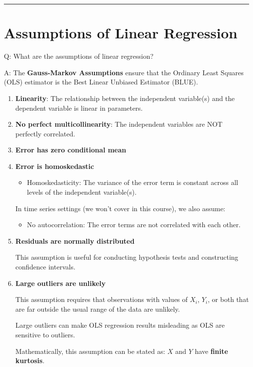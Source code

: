 \documentclass[
  12pt,
]{scrbook}
\providecommand{\tightlist}{%
  \setlength{\itemsep}{0pt}\setlength{\parskip}{0pt}}
\renewcommand{\tightlist}{\setlength{\itemsep}{0.5\baselineskip}\setlength{\parskip}{0.2\baselineskip}}
\theoremstyle{plain}
\theoremstyle{definition}
\theoremstyle{remark}
\begin{document}
\begin{center}\rule{0.5\linewidth}{0.5pt}\end{center}

\section{Assumptions of Linear
Regression}\label{assumptions-of-linear-regression}

Q: What are the assumptions of linear regression?

A: The \textbf{Gauss-Markov Assumptions} ensure that the Ordinary Least
Squares (OLS) estimator is the Best Linear Unbiased Estimator (BLUE).

\begin{enumerate}
\def\labelenumi{\arabic{enumi}.}
\item
  \textbf{Linearity}: The relationship between the independent
  variable(s) and the dependent variable is linear in parameters.
\item
  \textbf{No perfect multicollinearity}: The independent variables are
  NOT {perfectly correlated.}
\item
  \textbf{Error has zero conditional mean}
\item
  \textbf{Error is homoskedastic}

  \begin{itemize}
  \tightlist
  \item
    Homoskedasticity: The variance of the error term is constant across
    all levels of the independent variable(s).
  \end{itemize}

  {In time series settings (we won't cover in this course), we also
  assume:}

  \begin{itemize}
  \tightlist
  \item
    {No autocorrelation: The error terms are not correlated with each
    other.}
  \end{itemize}
\item
  \textbf{Residuals are normally distributed}

  This assumption is useful for conducting hypothesis tests and
  constructing confidence intervals.
\item
  \textbf{Large outliers are unlikely}

  This assumption requires that observations with values of \(X_i\),
  \(Y_i\), or both that are far outside the usual range of the data are
  unlikely.

  Large outliers can make OLS regression results misleading as OLS are
  sensitive to outliers.

  Mathematically, this assumption can be stated as: \(X\) and \(Y\) have
  \textbf{finite kurtosis}.
\end{enumerate}
\end{document}
